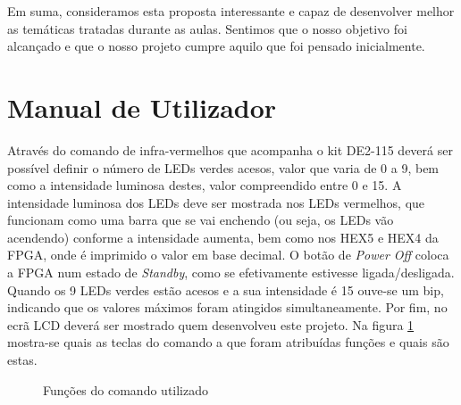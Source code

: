\documentclass[a4paper,11pt,openright,oneside]{report}
\begin{document}
Em suma, consideramos esta proposta interessante e capaz de desenvolver melhor as temáticas tratadas durante as aulas. Sentimos que o nosso objetivo foi alcançado e que o nosso projeto cumpre aquilo que foi pensado inicialmente.

\section{Manual de Utilizador}

Através do comando de infra-vermelhos que acompanha o kit DE2-115 deverá ser possível definir o número de LEDs verdes acesos, valor que varia de 0 a 9, bem como a intensidade luminosa destes, valor compreendido entre 0 e 15. A intensidade luminosa dos LEDs deve ser mostrada nos LEDs vermelhos, que funcionam como uma barra que se vai enchendo (ou seja, os LEDs vão acendendo) conforme a intensidade aumenta, bem como nos HEX5 e HEX4 da FPGA, onde é imprimido o valor em base decimal. O botão de \textit{Power Off} coloca a FPGA num estado de \textit{Standby}, como se efetivamente estivesse ligada/desligada. Quando os 9 LEDs verdes estão acesos e a sua intensidade é 15 ouve-se um bip, indicando que os valores máximos foram atingidos simultaneamente. Por fim, no ecrã LCD deverá ser mostrado quem desenvolveu este projeto. Na figura \ref{fig:ir_leds4} mostra-se quais as teclas do comando a que foram atribuídas funções e quais são estas.

\begin{figure}[ht]
\center
{}
\caption{Funções do comando utilizado}
\label{fig:ir_leds4}
\end{figure}

\maketitle
\nocite{*}
\end{document}
